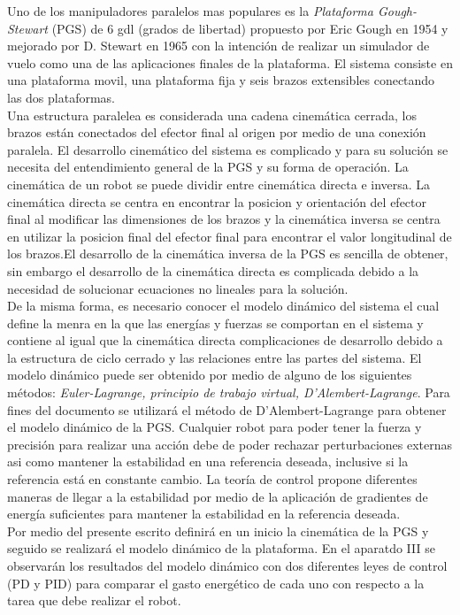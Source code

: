 Uno de los manipuladores paralelos mas populares es la \emph{Plataforma 
Gough-Stewart} (PGS) de 6 gdl (grados de libertad) propuesto por Eric Gough en 
1954 y mejorado por D. Stewart en 1965 con la intención de realizar un simulador 
de vuelo como una de las aplicaciones finales de la plataforma. El sistema 
consiste en una plataforma movil, una plataforma fija y seis brazos extensibles 
conectando las dos plataformas.\\

Una estructura paralelea es considerada 
una cadena cinemática cerrada, los brazos están conectados del efector final al 
origen por medio de una conexión paralela. El desarrollo cinemático del sistema 
es complicado y para su solución se necesita del entendimiento general de la PGS 
y su forma de operación. La cinemática de un robot se puede dividir entre 
cinemática directa e inversa. La cinemática directa se centra en encontrar la 
posicion y orientación del efector final al modificar las dimensiones de los 
brazos y la cinemática inversa se centra en utilizar la posicion final del 
efector final para encontrar el valor longitudinal de los brazos.El desarrollo 
de la cinemática inversa de la PGS es sencilla de obtener, sin embargo el 
desarrollo de la cinemática directa es complicada debido a la necesidad de 
solucionar ecuaciones no lineales para la solución. \\ 

De la misma forma, es 
necesario conocer el modelo dinámico del sistema el cual define la menra en la 
que las energías y fuerzas se comportan en el sistema y contiene al igual que la 
cinemática directa complicaciones de desarrollo debido a la estructura de ciclo 
cerrado y las relaciones entre las partes del sistema. El modelo dinámico puede 
ser obtenido por medio de alguno de los siguientes métodos: 
\emph{Euler-Lagrange, principio de trabajo virtual, D'Alembert-Lagrange}. Para 
fines del documento se utilizará el método de D'Alembert-Lagrange para obtener 
el modelo dinámico de la PGS. Cualquier robot para poder tener la fuerza y 
precisión para realizar una acción debe de poder rechazar perturbaciones 
externas asi como mantener la estabilidad en una referencia deseada, inclusive  
si la referencia está en constante cambio. La teoría de control propone 
diferentes maneras de llegar a la estabilidad por medio de la aplicación de 
gradientes de energía suficientes para mantener la estabilidad en la referencia 
deseada.\\ 

Por medio del presente escrito definirá en un inicio la cinemática 
de la PGS y seguido se realizará el modelo dinámico de la plataforma. En el 
aparatdo III se observarán los resultados del modelo dinámico con dos diferentes 
leyes de control (PD y PID) para comparar el gasto energético de cada uno con 
respecto a la tarea que debe realizar el robot.
